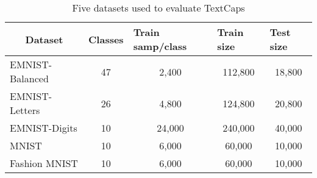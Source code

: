 \begin{table}[!h]
\caption{Five datasets used to evaluate TextCaps}
\label{table:data}
\centering
\footnotesize
\begin{tabular}{|p{2.7cm}|p{0.6cm}|p{1.1cm}|p{0.35cm}|p{0.35cm}|} 
\hline
\multicolumn{1}{|c|}{Dataset} & \multicolumn{1}{c|}{Classes} & Train samp/class & Train size & Test size \\ [1ex] 
\hline
EMNIST-Balanced\cite{2017arXiv170205373C} &  \multicolumn{1}{c|}{47}  &  \multicolumn{1}{c|}{2,400} & \multicolumn{1}{c|}{112,800}  &   \multicolumn{1}{c|}{18,800}  \\ 
\hline
EMNIST-Letters\cite{2017arXiv170205373C} &  \multicolumn{1}{c|}{26}  &  \multicolumn{1}{c|}{4,800} & \multicolumn{1}{c|}{124,800}  &  \multicolumn{1}{c|}{20,800}  \\
\hline
EMNIST-Digits\cite{2017arXiv170205373C} &  \multicolumn{1}{c|}{10}  &  \multicolumn{1}{c|}{24,000} &  \multicolumn{1}{c|}{240,000}  &   \multicolumn{1}{c|}{40,000}  \\ 
\hline
MNIST\cite{lecun1998mnist} &  \multicolumn{1}{c|}{10}  &  \multicolumn{1}{c|}{6,000} & \multicolumn{1}{c|}{60,000}  &   \multicolumn{1}{c|}{10,000}    \\ 
\hline
Fashion MNIST\cite{DBLP:journals/corr/abs-1708-07747} &  \multicolumn{1}{c|}{10}  & \multicolumn{1}{c|}{6,000} & \multicolumn{1}{c|}{60,000}  &  \multicolumn{1}{c|}{10,000}  \\[1ex]
\hline
\end{tabular}
\vspace{-4mm}
\end{table}
